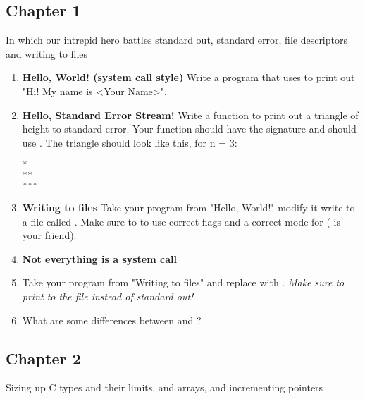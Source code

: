 \subsection{Chapter 1}

In which our intrepid hero battles standard out, standard error, file descriptors and writing to files

\begin{enumerate}
\item \textbf{Hello, World! (system call style)} Write a program that uses  to print out "Hi! My name is <Your Name>".
\item \textbf{Hello, Standard Error Stream!} Write a function to print out a triangle of height  to standard error.
Your function should have the signature  and should use .
The triangle should look like this, for n = 3:
\begin{lstlisting}[language=C]
*
**
***
\end{lstlisting}
\item \textbf{Writing to files} Take your program from "Hello, World!" modify it write to a file called . Make sure to to use correct flags and a correct mode for  ( is your friend).
\item \textbf{Not everything is a system call}
\item Take your program from "Writing to files" and replace  with . \textit{Make sure to print to the file instead of standard out!}
\item What are some differences between  and ?
\end{enumerate}

\subsection{Chapter 2}

Sizing up C types and their limits,  and  arrays, and incrementing pointers

